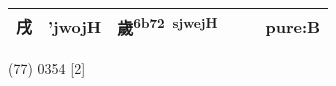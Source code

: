 \documentclass[14pt,a4paper]{scrartcl}
\begin{document}
\begin{longtable}[c]{@{}llllll@{}}
\begin{minipage}[t]{0.14\columnwidth}
戌
\strut\end{minipage} &
\begin{minipage}[t]{0.14\columnwidth}\raggedright\strut
'jwojH
\strut\end{minipage} &
\begin{minipage}[t]{0.14\columnwidth}\raggedright\strut
歲\textsuperscript{6b72~sjwejH}
\strut\end{minipage} &
\begin{minipage}[t]{0.14\columnwidth}\raggedright\strut
\strut\end{minipage} &
\begin{minipage}[t]{0.14\columnwidth}\raggedright\strut
\strut\end{minipage} &
\begin{minipage}[t]{0.14\columnwidth}\raggedright\strut
pure:B
\strut\end{minipage}\tabularnewline
\bottomrule
\end{longtable}

(77) 0354 {[}2{]}
\end{document}
